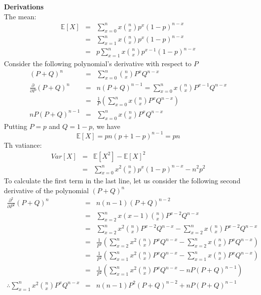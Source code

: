 \documentclass{article}
\begin{document}
\textbf{Derivations}\\
The mean:
\begin{eqnarray}
\mathbb{E}[X]  & = & \sum_{x=0}^{n} x \binom{n}{x}p^{x}(1-p)^{n-x}\\
               & = & \sum_{x=1}^{n} x \binom{n}{x} p^{x}(1-p)^{n-x}\\
               & = & p \sum_{x=1}^{n} x \binom{n}{x} p^{x-1}(1-p)^{n-x}
\end{eqnarray}
Consider the following polynomial's derivative with respect to $P$
\begin{eqnarray}
(P + Q)^{n} & = & \sum_{x=0}^{n} \binom{n}{x}P^{x}Q^{n-x}\\
\frac{\partial}{\partial P}(P + Q)^{n} & = & n(P + Q)^{n-1} = \sum_{x=0}^{n} x \binom{n}{x}P^{x-1}Q^{n-x} \\
                                       & = & \frac{1}{P} \left( \sum_{x=0}^{n} x \binom{n}{x}P^{x}Q^{n-x}\right)\\
 nP(P + Q)^{n-1} & = &  \sum_{x=0}^{n} x \binom{n}{x}P^{x}Q^{n-x}
\end{eqnarray}
Putting $P=p$ and $Q=1-p$, we have
\begin{equation}
\mathbb{E}[X] = pn(p+1-p)^{n-1} = pn
\end{equation}
Th vatiance:
\begin{eqnarray}
Var[X] & = & \mathbb{E}[X^{2}] - \mathbb{E}[X]^{2}\\
       & = & \sum_{x=0}^{n} x^{2} \binom{n}{x}p^{x}(1-p)^{n-x} - n^{2}p^{2}
\end{eqnarray}
To calculate the first term in the last line, let us consider the following second derivative of the polynomial $(P+Q)^{n}$
\begin{eqnarray}
\frac{\partial^{2}}{\partial P^{2}}(P + Q)^{n} & = & n(n-1)(P + Q)^{n-2} \nonumber\\ 
                                               & = & \sum_{x=2}^{n} x(x-1) \binom{n}{x}P^{x-2}Q^{n-x} \nonumber\\
                                               & = & \sum_{x=2}^{n} x^{2} \binom{n}{x}P^{x-2}Q^{n-x} - \sum_{x=2}^{n} x \binom{n}{x}P^{x-2}Q^{n-x} \nonumber\\
                                               & = & \frac{1}{P^{2}} \left( \sum_{x=2}^{n} x^{2} \binom{n}{x}P^{x}Q^{n-x} - \sum_{x=2}^{n} x \binom{n}{x}P^{x}Q^{n-x} \right) \nonumber\\
                                               & = & \frac{1}{P^{2}} \left( \sum_{x=1}^{n} x^{2} \binom{n}{x}P^{x}Q^{n-x} - \sum_{x=1}^{n} x \binom{n}{x}P^{x}Q^{n-x} \right) \nonumber\\
                                               & = & \frac{1}{P^{2}} \left( \sum_{x=1}^{n} x^{2} \binom{n}{x}P^{x}Q^{n-x} - nP(P+Q)^{n-1} \right) \nonumber\\
\therefore \sum_{x=1}^{n} x^{2} \binom{n}{x}P^{x}Q^{n-x} & = & n(n-1)P^{2}(P + Q)^{n-2} + nP(P+Q)^{n-1} \nonumber
\end{eqnarray}
\end{document}

